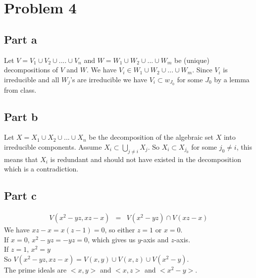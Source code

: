 \documentclass[12pt]{article}
\begin{document}
\clearpage
\section*{Problem 4}
\subsection*{Part a}
Let $V=V_1 \cup V_2 \cup .... \cup V_n$ and $W=W_1 \cup W_2 \cup ... \cup W_m$ be (unique) decompositions of $V$ and $W$. We have $V_i \in W_1 \cup W_2 \cup ... \cup W_m$. Since $V_i$ is irreducible and all $W_j$'s are irreducible we have $V_i \subset w_{J_0}$ for some $J_0$ by a lemma from class.
\subsection*{Part b}
Let $X= X_1 \cup X_2 \cup ... \cup X_n$ be the decomposition of the algebraic set $X$ into irreducible components. Assume $X_i \subset \bigcup_{j \not=i} X_j$.
So $X_i \subset X_{j_0}$ for some $j_0 \not= i$, this means that $X_i$ is redundant and should not have existed in the decomposition which is a contradiction.
\subsection*{Part c}
\begin{eqnarray*}
V(x^2-yz,xz-x) &=&
V(x^2-yz) \cap V(xz-x)
\end{eqnarray*}
We have $xz-x=x(z-1)=0$, so either $z=1$ or $x=0$. \\
If $x=0$, $x^2-yz=-yz=0$, which gives us $y$-axis and $z$-axis. \\
If $z=1$, $x^2=y$ \\
So $V(x^2-yz,xz-x)=V(x,y) \cup V(x,z) \cup V(x^2-y)$. \\
The prime ideals are $<x,y>$ and $<x,z>$ and $<x^2-y>$.

\clearpage
\end{document}
